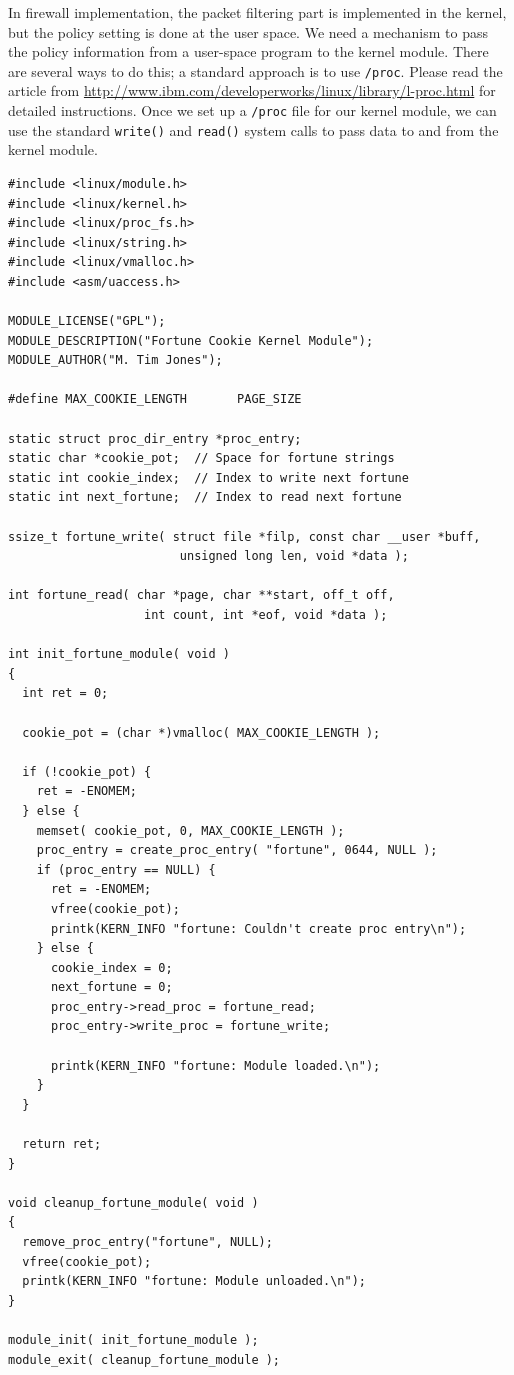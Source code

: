 In firewall implementation, the packet filtering part is implemented
in the kernel, but the policy setting is done at the user space.
We need a mechanism to pass the policy information from a user-space 
program to the kernel module. There are several ways to 
do this; a standard approach is to use {\tt /proc}.
Please read the article from 
\url{http://www.ibm.com/developerworks/linux/library/l-proc.html} 
for detailed instructions. Once we set up a {\tt /proc} file 
for our kernel module, we can use the standard {\tt write()} and {\tt read()}
system calls to pass data to and from the kernel module. 

\begin{Verbatim}[frame=single]
#include <linux/module.h>
#include <linux/kernel.h>
#include <linux/proc_fs.h>
#include <linux/string.h>
#include <linux/vmalloc.h>
#include <asm/uaccess.h>

MODULE_LICENSE("GPL");
MODULE_DESCRIPTION("Fortune Cookie Kernel Module");
MODULE_AUTHOR("M. Tim Jones");

#define MAX_COOKIE_LENGTH       PAGE_SIZE

static struct proc_dir_entry *proc_entry;
static char *cookie_pot;  // Space for fortune strings
static int cookie_index;  // Index to write next fortune
static int next_fortune;  // Index to read next fortune

ssize_t fortune_write( struct file *filp, const char __user *buff,
                        unsigned long len, void *data );

int fortune_read( char *page, char **start, off_t off,
                   int count, int *eof, void *data );

int init_fortune_module( void )
{
  int ret = 0;

  cookie_pot = (char *)vmalloc( MAX_COOKIE_LENGTH );

  if (!cookie_pot) {
    ret = -ENOMEM;
  } else {
    memset( cookie_pot, 0, MAX_COOKIE_LENGTH );
    proc_entry = create_proc_entry( "fortune", 0644, NULL );
    if (proc_entry == NULL) {
      ret = -ENOMEM;
      vfree(cookie_pot);
      printk(KERN_INFO "fortune: Couldn't create proc entry\n");
    } else {
      cookie_index = 0;
      next_fortune = 0;
      proc_entry->read_proc = fortune_read;
      proc_entry->write_proc = fortune_write;

      printk(KERN_INFO "fortune: Module loaded.\n");
    }
  }

  return ret;
}

void cleanup_fortune_module( void )
{
  remove_proc_entry("fortune", NULL);
  vfree(cookie_pot);
  printk(KERN_INFO "fortune: Module unloaded.\n");
}

module_init( init_fortune_module );
module_exit( cleanup_fortune_module );
\end{Verbatim}

